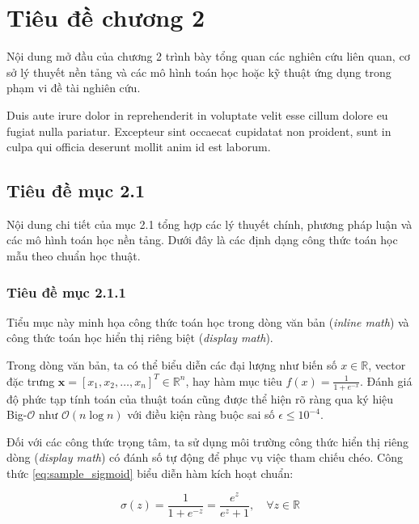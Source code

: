 
\chapter{Tiêu đề chương 2}
\label{chap:chapter_2}

Nội dung mở đầu của chương 2 trình bày tổng quan các nghiên cứu liên quan, cơ sở lý thuyết nền tảng và các mô hình toán học hoặc kỹ thuật ứng dụng trong phạm vi đề tài nghiên cứu.

Duis aute irure dolor in reprehenderit in voluptate velit esse cillum dolore eu fugiat nulla pariatur. Excepteur sint occaecat cupidatat non proident, sunt in culpa qui officia deserunt mollit anim id est laborum.

\section{Tiêu đề mục 2.1}
\label{sec:section_2_1}

Nội dung chi tiết của mục 2.1 tổng hợp các lý thuyết chính, phương pháp luận và các mô hình toán học nền tảng. Dưới đây là các định dạng công thức toán học mẫu theo chuẩn học thuật.

\subsection{Tiêu đề mục 2.1.1}
\label{subsec:subsection_2_1_1}

Tiểu mục này minh họa công thức toán học trong dòng văn bản (\textit{inline math}) và công thức toán học hiển thị riêng biệt (\textit{display math}).

Trong dòng văn bản, ta có thể biểu diễn các đại lượng như biến số $x \in \mathbb{R}$, vector đặc trưng $\mathbf{x} = [x_1, x_2, \dots, x_n]^T \in \mathbb{R}^n$, hay hàm mục tiêu $f(x) = \frac{1}{1 + e^{-x}}$. Đánh giá độ phức tạp tính toán của thuật toán cũng được thể hiện rõ ràng qua ký hiệu Big-$\mathcal{O}$ như $\mathcal{O}(n \log n)$ với điều kiện ràng buộc sai số $\epsilon \le 10^{-4}$.

Đối với các công thức trọng tâm, ta sử dụng môi trường công thức hiển thị riêng dòng (\textit{display math}) có đánh số tự động để phục vụ việc tham chiếu chéo. Công thức \eqref{eq:sample_sigmoid} biểu diễn hàm kích hoạt chuẩn:

\begin{equation}
    \label{eq:sample_sigmoid}
    \sigma(z) = \frac{1}{1 + e^{-z}} = \frac{e^z}{e^z + 1}, \quad \forall z \in \mathbb{R}
\end{equation}


